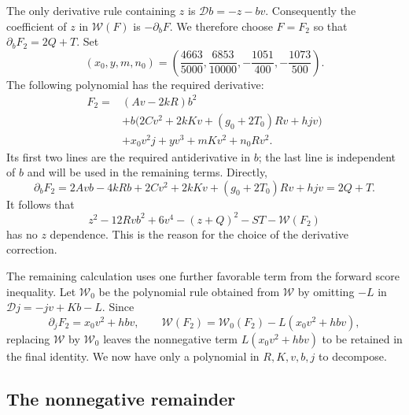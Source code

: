 The only derivative rule containing $z$ is
$\mathcal Db=-z-bv$.  Consequently the coefficient of $z$ in
$\mathcal W(F)$ is $-\partial_bF$.  We therefore choose $F=F_2$ so that
$\partial_bF_2=2Q+T$.  Set
\begin{equation}\label{cert:constants-second}
 (x_0,y,m,n_0)
 =\left(\frac{4663}{5000},\frac{6853}{10000},
          -\frac{1051}{400},-\frac{1073}{500}\right).
\end{equation}
The following polynomial has the required derivative:
\begin{equation}\label{cert:polynomials}
\begin{aligned}
 F_2={}&(Av-2kR)b^2\\
       &+b\bigl(2Cv^2+2kKv+(g_0+2T_0)Rv+hjv\bigr)\\
       &+x_0v^2j+yv^3+mKv^2+n_0Rv^2.
\end{aligned}
\end{equation}
Its first two lines are the required antiderivative in $b$; the last line
is independent of $b$ and will be used in the remaining terms.  Directly,
\[
 \partial_bF_2
 =2Avb-4kRb+2Cv^2+2kKv+(g_0+2T_0)Rv+hjv
 =2Q+T.
\]
It follows that
\[
 z^2-12Rvb^2+6v^4-(z+Q)^2-ST-\mathcal W(F_2)
\]
has no $z$ dependence.  This is the reason for the choice of the derivative
correction.

The remaining calculation uses one further favorable term from the forward
score inequality.  Let $\mathcal W_0$ be the polynomial rule obtained from
$\mathcal W$ by omitting $-L$ in $\mathcal Dj=-jv+Kb-L$.  Since
\begin{equation}\label{cert:L-correction}
 \partial_jF_2=x_0v^2+hbv,
 \qquad
 \mathcal W(F_2)=\mathcal W_0(F_2)-L(x_0v^2+hbv),
\end{equation}
replacing $\mathcal W$ by $\mathcal W_0$ leaves the nonnegative term
$L(x_0v^2+hbv)$ to be retained in the final identity.  We now have only a
polynomial in $R,K,v,b,j$ to decompose.

\subsection{The nonnegative remainder}

